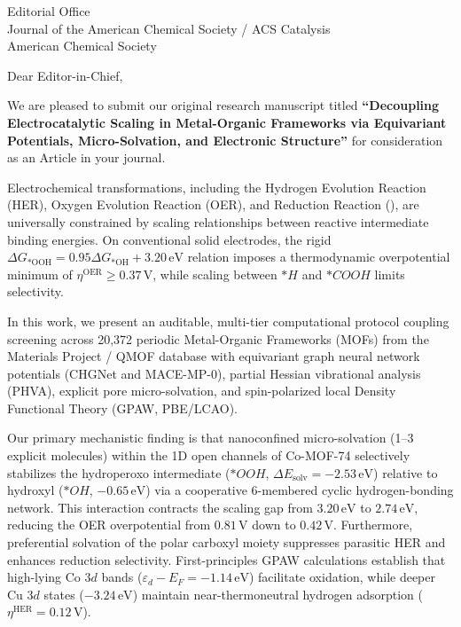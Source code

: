 \documentclass[11pt]{letter}
\begin{document}
\begin{letter}{Editorial Office \\
Journal of the American Chemical Society / ACS Catalysis \\
American Chemical Society}

\opening{Dear Editor-in-Chief,}

We are pleased to submit our original research manuscript titled \textbf{``Decoupling Electrocatalytic Scaling in Metal-Organic Frameworks via Equivariant Potentials, Micro-Solvation, and Electronic Structure''} for consideration as an Article in your journal.

Electrochemical transformations, including the Hydrogen Evolution Reaction (HER), Oxygen Evolution Reaction (OER), and  Reduction Reaction (), are universally constrained by scaling relationships between reactive intermediate binding energies. On conventional solid electrodes, the rigid $\Delta G_{*\text{OOH}} = 0.95\Delta G_{*\text{OH}} + 3.20\,\text{eV}$ relation imposes a thermodynamic overpotential minimum of $\eta^{\text{OER}} \ge 0.37\,\text{V}$, while scaling between $*H$ and $*COOH$ limits selectivity.

In this work, we present an auditable, multi-tier computational protocol coupling screening across 20,372 periodic Metal-Organic Frameworks (MOFs) from the Materials Project / QMOF database with equivariant graph neural network potentials (CHGNet and MACE-MP-0), partial Hessian vibrational analysis (PHVA), explicit pore micro-solvation, and spin-polarized local Density Functional Theory (GPAW, PBE/LCAO). 

Our primary mechanistic finding is that nanoconfined micro-solvation (1--3 explicit  molecules) within the 1D open channels of Co-MOF-74 selectively stabilizes the hydroperoxo intermediate ($*OOH$, $\Delta E_{\text{solv}} = -2.53\,\text{eV}$) relative to hydroxyl ($*OH$, $-0.65\,\text{eV}$) via a cooperative 6-membered cyclic hydrogen-bonding network. This interaction contracts the scaling gap from $3.20\,\text{eV}$ to $2.74\,\text{eV}$, reducing the OER overpotential from $0.81\,\text{V}$ down to $0.42\,\text{V}$. Furthermore, preferential solvation of the polar carboxyl moiety suppresses parasitic HER and enhances  reduction selectivity. First-principles GPAW calculations establish that high-lying Co $3d$ bands ($\varepsilon_d - E_F = -1.14\,\text{eV}$) facilitate oxidation, while deeper Cu $3d$ states ($-3.24\,\text{eV}$) maintain near-thermoneutral hydrogen adsorption ($\eta^{\text{HER}} = 0.12\,\text{V}$).


\end{letter}
\end{document}
